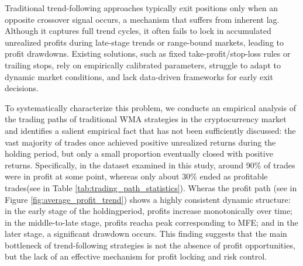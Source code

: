 \documentclass[12pt]{article}
\begin{document}
Traditional trend-following approaches typically exit positions only when an opposite 
crossover signal occurs, a mechanism that suffers from inherent lag. Although it captures 
full trend cycles, it often fails to lock in accumulated unrealized profits during 
late-stage trends or range-bound markets, leading to profit drawdowns. Existing solutions, 
such as fixed take-profit/stop-loss rules or trailing stops, rely on empirically calibrated 
parameters, struggle to adapt to dynamic market conditions, and lack data-driven frameworks 
for early exit decisions.

To systematically characterize this problem, we conducts an empirical analysis of the trading 
paths of traditional WMA strategies in the cryptocurrency market and identifies a salient 
empirical fact that has not been sufficiently discussed: the vast majority of trades 
once achieved positive unrealized returns during the holding period, but only a small proportion 
eventually closed with positive returns. Specifically, in the dataset examined in this study, 
around 90\% of trades were in profit at some point, whereas only about 30\% ended as profitable 
trades(see in Table \ref{tab:trading_path_statistics}). Wheras the profit path
(see in Figure \ref{fig:average_profit_trend}) shows a highly consistent dynamic structure: 
in the early stage of the holdingperiod, profits increase monotonically over time; in the 
middle-to-late stage, profits reacha peak corresponding to MFE; and in the later stage, a 
significant drawdown occurs. This finding suggests that the main bottleneck of trend-following 
strategies is not the absence of profit opportunities, but the lack of an effective 
mechanism for profit locking and risk control.
\end{document}

